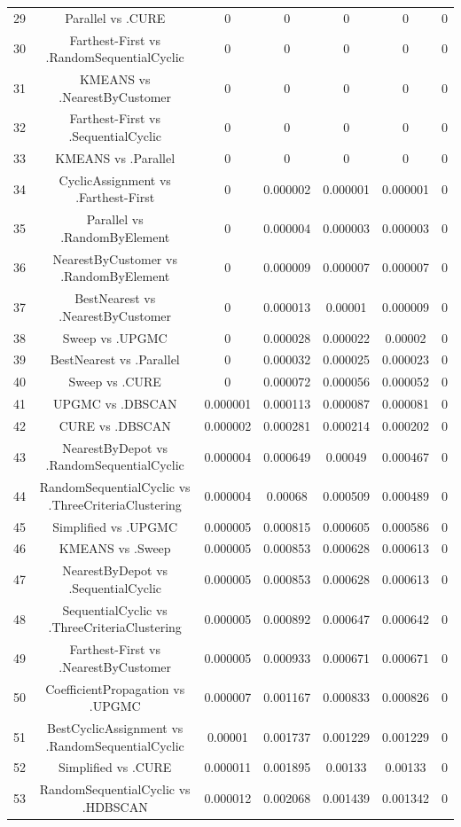 \documentclass[a4paper,10pt]{article}
\begin{document}
\begin{landscape}
\begin{table}[!htp]
\begin{tabular}{ccccccc}
29&Parallel vs .CURE&0&0&0&0&0\\
30&Farthest-First vs .RandomSequentialCyclic&0&0&0&0&0\\
31&KMEANS vs .NearestByCustomer&0&0&0&0&0\\
32&Farthest-First vs .SequentialCyclic&0&0&0&0&0\\
33&KMEANS vs .Parallel&0&0&0&0&0\\
34&CyclicAssignment vs .Farthest-First&0&0.000002&0.000001&0.000001&0\\
35&Parallel vs .RandomByElement&0&0.000004&0.000003&0.000003&0\\
36&NearestByCustomer vs .RandomByElement&0&0.000009&0.000007&0.000007&0\\
37&BestNearest vs .NearestByCustomer&0&0.000013&0.00001&0.000009&0\\
38&Sweep vs .UPGMC&0&0.000028&0.000022&0.00002&0\\
39&BestNearest vs .Parallel&0&0.000032&0.000025&0.000023&0\\
40&Sweep vs .CURE&0&0.000072&0.000056&0.000052&0\\
41&UPGMC vs .DBSCAN&0.000001&0.000113&0.000087&0.000081&0\\
42&CURE vs .DBSCAN&0.000002&0.000281&0.000214&0.000202&0\\
43&NearestByDepot vs .RandomSequentialCyclic&0.000004&0.000649&0.00049&0.000467&0\\
44&RandomSequentialCyclic vs .ThreeCriteriaClustering&0.000004&0.00068&0.000509&0.000489&0\\
45&Simplified vs .UPGMC&0.000005&0.000815&0.000605&0.000586&0\\
46&KMEANS vs .Sweep&0.000005&0.000853&0.000628&0.000613&0\\
47&NearestByDepot vs .SequentialCyclic&0.000005&0.000853&0.000628&0.000613&0\\
48&SequentialCyclic vs .ThreeCriteriaClustering&0.000005&0.000892&0.000647&0.000642&0\\
49&Farthest-First vs .NearestByCustomer&0.000005&0.000933&0.000671&0.000671&0\\
50&CoefficientPropagation vs .UPGMC&0.000007&0.001167&0.000833&0.000826&0\\
51&BestCyclicAssignment vs .RandomSequentialCyclic&0.00001&0.001737&0.001229&0.001229&0\\
52&Simplified vs .CURE&0.000011&0.001895&0.00133&0.00133&0\\
53&RandomSequentialCyclic vs .HDBSCAN&0.000012&0.002068&0.001439&0.001342&0\\

\end{tabular}
\end{table}
\end{landscape}
\end{document}
